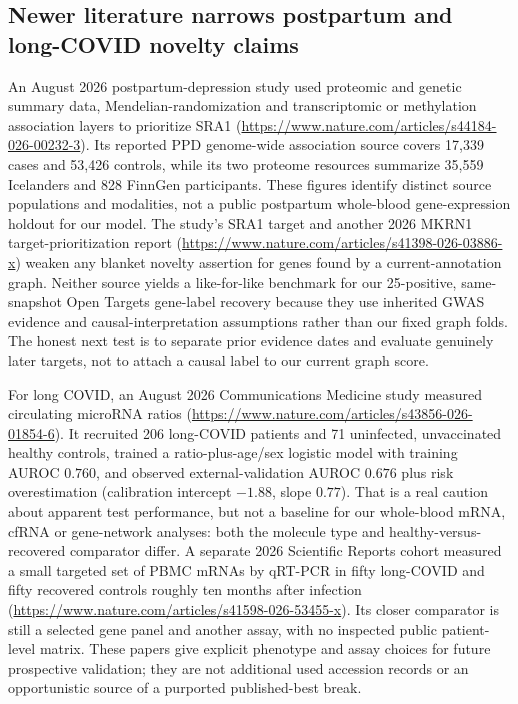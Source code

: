\documentclass[11pt,a4paper]{article}
\begin{document}
\subsection{Newer literature narrows postpartum and long-COVID novelty claims}
An August 2026 postpartum-depression study used proteomic and genetic summary data, Mendelian-randomization and transcriptomic or methylation association layers to prioritize SRA1 (\url{https://www.nature.com/articles/s44184-026-00232-3}). Its reported PPD genome-wide association source covers 17,339 cases and 53,426 controls, while its two proteome resources summarize 35,559 Icelanders and 828 FinnGen participants. These figures identify distinct source populations and modalities, not a public postpartum whole-blood gene-expression holdout for our model. The study's SRA1 target and another 2026 MKRN1 target-prioritization report (\url{https://www.nature.com/articles/s41398-026-03886-x}) weaken any blanket novelty assertion for genes found by a current-annotation graph. Neither source yields a like-for-like benchmark for our 25-positive, same-snapshot Open Targets gene-label recovery because they use inherited GWAS evidence and causal-interpretation assumptions rather than our fixed graph folds. The honest next test is to separate prior evidence dates and evaluate genuinely later targets, not to attach a causal label to our current graph score.

For long COVID, an August 2026 Communications Medicine study measured circulating microRNA ratios (\url{https://www.nature.com/articles/s43856-026-01854-6}). It recruited 206 long-COVID patients and 71 uninfected, unvaccinated healthy controls, trained a ratio-plus-age/sex logistic model with training AUROC $0.760$, and observed external-validation AUROC $0.676$ plus risk overestimation (calibration intercept $-1.88$, slope $0.77$). That is a real caution about apparent test performance, but not a baseline for our whole-blood mRNA, cfRNA or gene-network analyses: both the molecule type and healthy-versus-recovered comparator differ. A separate 2026 Scientific Reports cohort measured a small targeted set of PBMC mRNAs by qRT-PCR in fifty long-COVID and fifty recovered controls roughly ten months after infection (\url{https://www.nature.com/articles/s41598-026-53455-x}). Its closer comparator is still a selected gene panel and another assay, with no inspected public patient-level matrix. These papers give explicit phenotype and assay choices for future prospective validation; they are not additional used accession records or an opportunistic source of a purported published-best break.
\end{document}
